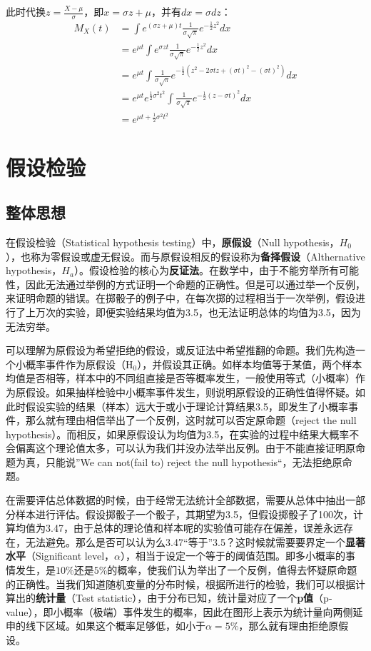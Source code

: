 \documentclass[11pt]{article}
\begin{document}
此时代换$z=\frac{X-\mu}{\sigma}$，即$x= \sigma z + \mu$，并有$dx=\sigma dz$：
\begin{align*}
    M_X(t) &= \int e^{(\sigma z + \mu)t} \frac{1}{\sigma\sqrt{\pi}} e^{-\frac{1}{2}z^2}dx \\
    &= e^{\mu t} \int e^{\sigma z t} \frac{1}{\sigma\sqrt{\pi}} e^{-\frac{1}{2}z^2}dx \\
    &= e^{\mu t} \int \frac{1}{\sigma\sqrt{\pi}} e^{-\frac{1}{2} (z^2 -2\sigma t z + (\sigma t)^2 -(\sigma t)^2)}dx \\
    &= e^{\mu t} e^{\frac{1}{2} \sigma^2 t^2} \int \frac{1}{\sigma\sqrt{\pi}} e^{-\frac{1}{2} (z - \sigma t)^2}dx \\
    &= e^{\mu t + \frac{1}{2} \sigma^2 t^2}
\end{align*}

\section{假设检验}

\subsection{整体思想}

在假设检验（Statistical hypothesis testing）中，\textbf{原假设}（Null hypothesis，$H_0$），也称为零假设或虚无假设。而与原假设相反的假设称为\textbf{备择假设}（Althernative hypothesis，$H_a$）。假设检验的核心为\textbf{反证法}。在数学中，由于不能穷举所有可能性，因此无法通过举例的方式证明一个命题的正确性。但是可以通过举一个反例，来证明命题的错误。在掷骰子的例子中，在每次掷的过程相当于一次举例，假设进行了上万次的实验，即便实验结果均值为3.5，也无法证明总体的均值为3.5，因为无法穷举。

可以理解为原假设为希望拒绝的假设，或反证法中希望推翻的命题。我们先构造一个小概率事件作为原假设（$\text{H}_0$），并假设其正确。如样本均值等于某值，两个样本均值是否相等，样本中的不同组直接是否等概率发生，一般使用等式（小概率）作为原假设。如果抽样检验中小概率事件发生，则说明原假设的正确性值得怀疑。如此时假设实验的结果（样本）远大于或小于理论计算结果3.5，即发生了小概率事件，那么就有理由相信举出了一个反例，这时就可以否定原命题（reject the null hypothesis）。而相反，如果原假设认为均值为3.5，在实验的过程中结果大概率不会偏离这个理论值太多，可以认为我们并没办法举出反例。由于不能直接证明原命题为真，只能说”We can not(fail to) reject the null hypothesis“，无法拒绝原命题。

在需要评估总体数据的时候，由于经常无法统计全部数据，需要从总体中抽出一部分样本进行评估。假设掷骰子一个骰子，其期望为3.5，但假设掷骰子了100次，计算均值为3.47，由于总体的理论值和样本呢的实验值可能存在偏差，误差永远存在，无法避免。那么是否可以认为么3.47“等于”3.5？这时候就需要要界定一个\textbf{显著水平}（Significant level，$\alpha$），相当于设定一个等于的阈值范围。即多小概率的事情发生，是$10\%$还是$5\%$的概率，使我们认为举出了一个反例，值得去怀疑原命题的正确性。当我们知道随机变量的分布时候，根据所进行的检验，我们可以根据计算出的\textbf{统计量}（Test statistic），由于分布已知，统计量对应了一个\textbf{p值}（p-value），即小概率（极端）事件发生的概率，因此在图形上表示为统计量向两侧延申的线下区域。如果这个概率足够低，如小于$\alpha=5\%$，那么就有理由拒绝原假设。
\end{document}
